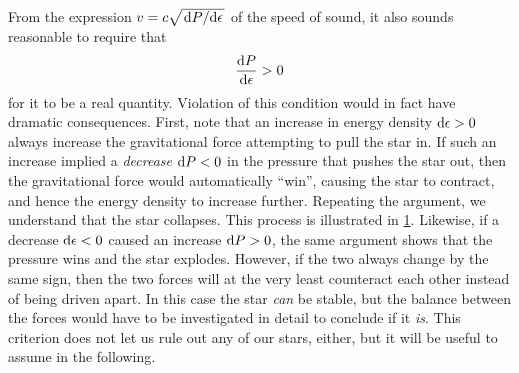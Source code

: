 From the expression $v = c \sqrt{\odv{P}/{\epsilon}}$ of the speed of sound, it also sounds reasonable to require that
\begin{equation}
	\odv{P}{\epsilon} > 0
\label{eq:nstars:stability_pressure_energy_density}
\end{equation}
for it to be a real quantity.
Violation of this condition would in fact have dramatic consequences.
First, note that an increase in energy density $\mathop{}\!\mathrm{d} \epsilon > 0$ always increase the gravitational force attempting to pull the star in.
If such an increase implied a \emph{decrease} $\mathop{}\!\mathrm{d} P < 0$ in the pressure that pushes the star out, then the gravitational force would automatically ``win'', causing the star to contract, and hence the energy density to increase further.
Repeating the argument, we understand that the star collapses.
This process is illustrated in \cref{fig:nstars:stability_mass_pressure}.
Likewise, if a decrease $\mathop{}\!\mathrm{d} \epsilon < 0$ caused an increase $\mathop{}\!\mathrm{d} P > 0$, the same argument shows that the pressure wins and the star explodes.
However, if the two always change by the same sign, then the two forces will at the very least counteract each other instead of being driven apart.
In this case the star \emph{can} be stable, but the balance between the forces would have to be investigated in detail to conclude if it \emph{is}.
This criterion does not let us rule out any of our stars, either, but it will be useful to assume  in the following.

\begin{figure}
\centering
{}
\caption{\label{fig:nstars:stability_mass_pressure}}
\end{figure}

